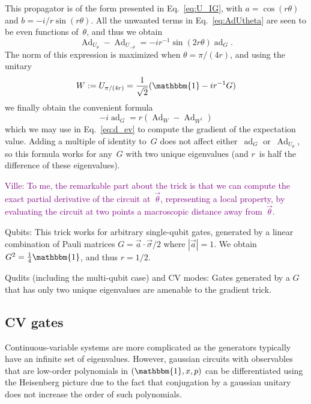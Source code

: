 \documentclass[aps,pra,10pt,twocolumn,groupedaddress,nofootinbib]{revtex4-1}
\theoremstyle{plain}
\DeclareMathOperator{\Ad}{Ad}
\DeclareMathOperator{\ad}{ad}
\newcommand{\be}{\begin{equation}}
\newcommand{\ee}{\end{equation}}
\newcommand{\I}{\mathbbm{1}} %
\newcommand{\ville}[1]{\textcolor{purple}{Ville: #1}}
\begin{document}


This propagator is of the form presented in Eq.~\eqref{eq:U_IG},
with $a=\cos(r\theta)$ and $b=-i/r \sin(r\theta)$.
All the unwanted terms in Eq.~\eqref{eq:AdUtheta} are seen to be even functions of~$\theta$,
and thus we obtain
\be
\Ad_{U_\theta} -\Ad_{U_{-\theta}}
=
-i r^{-1} \sin(2r\theta) \ad_G.
\ee
The norm of this expression is maximized when $\theta = \pi/(4r)$,
and using the unitary
\be
W := U_{\pi/(4r)} = \frac{1}{\sqrt{2}}(\I -ir^{-1}G)
\ee
we finally obtain the convenient formula
\be
\label{eq:adAdformula}
-i\ad_G = r(\Ad_W-\Ad_{W^\dagger})
\ee
which we may use in Eq.~\eqref{eq:d_ev} to compute the gradient of the expectation value.
Adding a multiple of identity to~$G$ does not affect either~$\ad_G$ or~$\Ad_{U_{\theta}}$,
so this formula works for any~$G$ with two unique eigenvalues (and $r$~is half the difference of these eigenvalues).

\ville{To me, the remarkable part about the trick is that we can compute the exact partial derivative of the circuit at~$\vec{\theta}$,
  representing a local property, by evaluating the circuit at two points a macroscopic distance away from~$\vec{\theta}$.}


Qubits:
This trick works for arbitrary single-qubit gates, generated by a linear combination of Pauli matrices
$G = \vec{a} \cdot \vec{\sigma}/2$
where $|\vec{a}|=1$.
We obtain $G^2 = \frac{1}{4} \I$, and thus $r=1/2$.

Qudits (including the multi-qubit case) and CV modes:
Gates generated by a $G$ that has only two unique eigenvalues are amenable to the gradient trick.


\subsection{CV gates}

\newcommand{\vt}{\vec{\theta}}
\newcommand{\vR}{\vec{r}}

Continuous-variable systems are more complicated as the generators typically have an infinite set of eigenvalues.
However, gaussian circuits with observables that are low-order polynomials in $(\I, x, p)$
can be differentiated using the Heisenberg picture due to the fact that conjugation by a gaussian unitary
does not increase the order of such polynomials.
\end{document}
